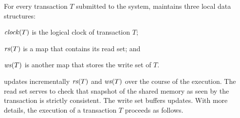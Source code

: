 For every transaction $T$ submitted to the system,  maintains three local data structures:
\begin{inparaenumorig}[]
\item $\clockOf{T}$ is the logical clock of transaction $T$;
\item $\readSetOf{T}$ is a map that contains its read set; and 
\item $\writeSetOf{T}$ is another map that stores the write set of $T$.
\end{inparaenumorig}
 updates incrementally $\readSetOf{T}$ and $\writeSetOf{T}$ over the course of the execution.
The read set serves to check that snapshot of the shared memory as seen by the transaction is strictly consistent.
The write set buffers updates.
With more details, the execution of a transaction $T$ proceeds as follows.
